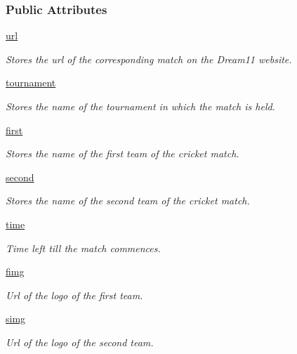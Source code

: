 \subsubsection*{Public Attributes}
\begin{DoxyCompactItemize}
\item 
\hyperlink{classproject_1_1Match_aeac700e0377708bc3d768f572544ab5e}{url}
\begin{DoxyCompactList}\small\item\em Stores the url of the corresponding match on the Dream11 website. \end{DoxyCompactList}\item 
\hyperlink{classproject_1_1Match_ac377f100bd078655a754762297731e8a}{tournament}
\begin{DoxyCompactList}\small\item\em Stores the name of the tournament in which the match is held. \end{DoxyCompactList}\item 
\hyperlink{classproject_1_1Match_ae8c662a467c74a3b376cbddf4124a84c}{first}
\begin{DoxyCompactList}\small\item\em Stores the name of the first team of the cricket match. \end{DoxyCompactList}\item 
\hyperlink{classproject_1_1Match_a4fcd044cc75f74987b145b1ea24b917c}{second}
\begin{DoxyCompactList}\small\item\em Stores the name of the second team of the cricket match. \end{DoxyCompactList}\item 
\hyperlink{classproject_1_1Match_ae51416730a405b3cad5df20a3e58cbdb}{time}
\begin{DoxyCompactList}\small\item\em Time left till the match commences. \end{DoxyCompactList}\item 
\hyperlink{classproject_1_1Match_a76c2df132c697094719f0d7450994811}{fimg}
\begin{DoxyCompactList}\small\item\em Url of the logo of the first team. \end{DoxyCompactList}\item 
\hyperlink{classproject_1_1Match_acca1adecce8205e38cc55c43b70b2867}{simg}
\begin{DoxyCompactList}\small\item\em Url of the logo of the second team. \end{DoxyCompactList}\item 

\end{DoxyCompactItemize}
